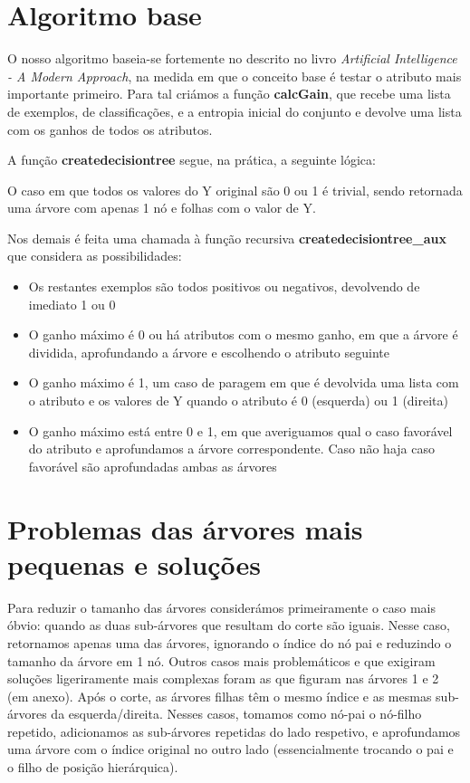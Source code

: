 \documentclass[12pt]{article}
\title{\vspace{-4.0cm}{Relatório 2ª Entrega - Árvores de Decisão}}
\author{Groupo al059 \and António Romeu Pinheiro (92427)\\Leonor Veloso (92509)}
\begin{document}
\maketitle

\section{Algoritmo base}
O nosso algoritmo baseia-se fortemente no descrito no livro \textit{Artificial
Intelligence - A Modern Approach}, na medida em que o conceito base é testar o
atributo mais importante primeiro. Para tal criámos a função \textbf{calcGain},
que recebe uma lista de exemplos, de classificações, e a entropia inicial do
conjunto e devolve uma lista com os ganhos de todos os atributos.\par
A função \textbf{createdecisiontree} segue, na prática, a seguinte lógica:\par
O caso em que todos os valores do Y original são 0 ou 1 é trivial,
sendo retornada uma árvore com apenas 1 nó e folhas com o valor de Y.\par
Nos demais é feita uma chamada à função recursiva 
\textbf{createdecisiontree\_aux} que considera as possibilidades:
\begin{itemize}
    \item Os restantes exemplos são todos positivos ou negativos, devolvendo de
    imediato 1 ou 0
    \item O ganho máximo é 0 ou há atributos com o mesmo ganho, em que a árvore
    é dividida, aprofundando a árvore e escolhendo o atributo seguinte
    \item O ganho máximo é 1, um caso de paragem em que é devolvida uma lista
    com o atributo e os valores de Y quando o atributo é 0 (esquerda) ou 1 
    (direita)
    \item O ganho máximo está entre 0 e 1, em que averiguamos qual o caso
    favorável do atributo e aprofundamos a árvore correspondente. Caso não haja 
    caso favorável são aprofundadas ambas as árvores
\end{itemize}

\section{Problemas das árvores mais pequenas e soluções}
Para reduzir o tamanho das árvores considerámos primeiramente o caso mais óbvio: 
quando as duas sub-árvores que resultam do corte são iguais. Nesse caso, 
retornamos apenas uma das árvores, ignorando o índice do nó pai e reduzindo o 
tamanho da árvore em 1 nó. 
Outros casos mais problemáticos e que exigiram soluções ligeriramente mais
complexas foram as que figuram nas árvores 1 e 2 (em anexo).
Após o corte, as árvores filhas têm o mesmo índice e as mesmas sub-árvores da 
esquerda/direita. Nesses casos, tomamos como nó-pai o nó-filho repetido, 
adicionamos as sub-árvores repetidas do lado respetivo, e aprofundamos uma 
árvore com o índice original no outro lado (essencialmente trocando o pai e o 
filho de posição hierárquica).
\end{document}
